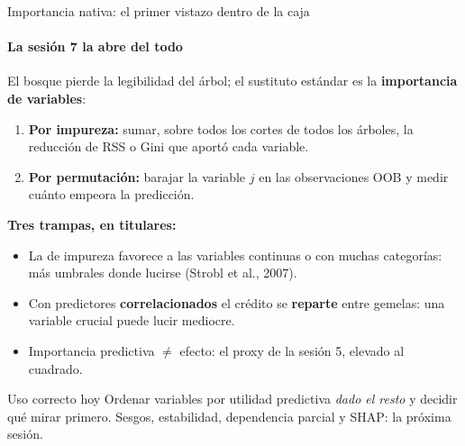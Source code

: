 \documentclass{beamer}
\newcommand{\1}{\mathbb{I}}
\begin{document}
\begin{frame}{Importancia nativa: el primer vistazo dentro de la caja}
\framesubtitle{La sesión 7 la abre del todo}
\small
El bosque pierde la legibilidad del árbol; el sustituto estándar es la \textbf{importancia de variables}:
\begin{enumerate}\itemsep2pt
  \item \textbf{Por impureza:} sumar, sobre todos los cortes de todos los árboles, la reducción de RSS o Gini que aportó cada variable.
  \item \textbf{Por permutación:} barajar la variable $j$ en las observaciones OOB y medir cuánto empeora la predicción.
\end{enumerate}
\pause
\textbf{Tres trampas, en titulares:}
\begin{itemize}\itemsep1pt
  \item La de impureza favorece a las variables continuas o con muchas categorías: más umbrales donde lucirse (Strobl et al., 2007).
  \item Con predictores \textbf{correlacionados} el crédito se \textbf{reparte} entre gemelas: una variable crucial puede lucir mediocre.
  \item Importancia predictiva $\neq$ efecto: el proxy de la sesión 5, elevado al cuadrado.
\end{itemize}
\pause
\begin{block}{Uso correcto hoy}
Ordenar variables por utilidad predictiva \emph{dado el resto} y decidir qué mirar primero. Sesgos, estabilidad, dependencia parcial y SHAP: la próxima sesión.
\end{block}
\end{frame}
\end{document}
